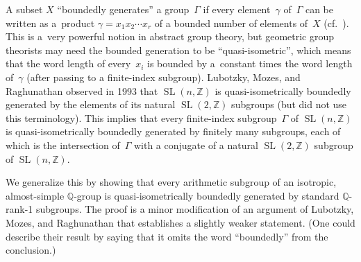 \documentclass[pdftex]{sigma}
\newcommand{\QQ}{\mathbb{Q}}
\newcommand{\ZZ}{\mathbb{Z}}
\DeclareMathOperator{\SL}{SL}
\numberwithin{equation}{section}
\theoremstyle{definition}
\begin{document}
A subset $X$ ``boundedly generates'' a group~$\Gamma$ if every element~$\gamma$ of~$\Gamma$ can be written as a~product $\gamma = x_1 x_2 \cdots x_r$ of a bounded number of elements of~$X$ (cf.~\cite[p.~203]{MR1278263}). This is a~very powerful notion in abstract group theory, but geometric group theorists may need the bounded generation to be ``quasi-isometric'', which means that the word length of every~$x_i$ is bounded by a~constant times the word length of~$\gamma$ (after passing to a finite-index subgroup). Lubotzky, Mozes, and Raghunathan \cite[Corollary~3]{MR1244421} observed in 1993 that $\SL(n,\ZZ)$ is quasi-isometrically boundedly generated by the elements of its natural $\SL(2,\ZZ)$ subgroups (but did not use this terminology). This implies that every finite-index subgroup~$\Gamma$ of $\SL(n,\ZZ)$ is quasi-isometrically boundedly generated by finitely many subgroups, each of which is the intersection of~$\Gamma$ with a conjugate of a natural $\SL(2,\ZZ)$ subgroup of $\SL(n,\ZZ)$.

We generalize this by showing that every arithmetic subgroup of an isotropic, almost-simple $\QQ$-group is quasi-isometrically boundedly generated by standard $\QQ$-rank-1 subgroups. The proof is a minor modification of an argument of Lubotzky, Mozes, and Raghunathan \cite[Section~4]{MR1828742} that establishes a slightly weaker statement. (One could describe their result by saying that it omits the word ``boundedly'' from the conclusion.)
\end{document}
